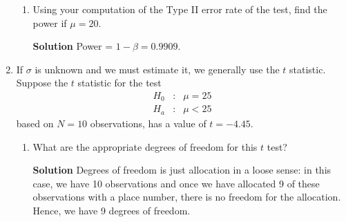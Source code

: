 \begin{enumerate}
\begin{enumerate}
        \item Using your computation of the Type II error rate of the test, find the power if $\mu = 20$.
        \begin{framed}{\textbf{Solution}}
        Power = $1 - \beta = 0.9909$.
        \end{framed}
        \FloatBarrier
        \begin{figure}[h]
        \centering
        \caption{}
        \label{fig:hw3q3e}
        \end{figure}
        \FloatBarrier
    \end{enumerate}
    
    \item If $\sigma$ is unknown and we must estimate it, we generally use the $t$ statistic. Suppose the $t$ statistic for the test
    \[
    \begin{matrix}
        H_0 & : & \mu=25 \\
        H_a & : & \mu<25
    \end{matrix}
    \]
    based on $N=10$ observations, has a value of $t = -4.45$.
    \begin{enumerate}
        \item What are the appropriate degrees of freedom for this $t$ test?
        \begin{framed}{\textbf{Solution}}
        Degrees of freedom is just allocation in a loose sense: in this case, we have 10 observations and once we have allocated 9 of these observations with a place number, there is no freedom for the  allocation. Hence, we have 9 degrees of freedom.
        \end{framed}
        

\end{enumerate}
\end{enumerate}
